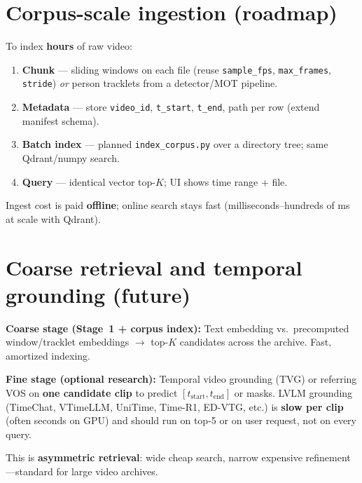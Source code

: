 \documentclass[11pt,a4paper]{article}
\begin{document}
\section{Corpus-scale ingestion (roadmap)}

\label{sec:corpus}

To index \textbf{hours} of raw video:
\begin{enumerate}
  \item \textbf{Chunk} --- sliding windows on each file (reuse \texttt{sample\_fps}, \texttt{max\_frames}, \texttt{stride}) \emph{or} person tracklets from a detector/MOT pipeline.
  \item \textbf{Metadata} --- store \texttt{video\_id}, \texttt{t\_start}, \texttt{t\_end}, path per row (extend manifest schema).
  \item \textbf{Batch index} --- planned \texttt{index\_corpus.py} over a directory tree; same Qdrant/numpy search.
  \item \textbf{Query} --- identical vector top-$K$; UI shows time range + file.
\end{enumerate}

Ingest cost is paid \textbf{offline}; online search stays fast (milliseconds--hundreds of ms at scale with Qdrant).

\section{Coarse retrieval and temporal grounding (future)}

\label{sec:grounding}

\textbf{Coarse stage (Stage~1 + corpus index):} Text embedding vs.\ precomputed window/tracklet embeddings $\rightarrow$ top-$K$ candidates across the archive.
Fast, amortized indexing.

\textbf{Fine stage (optional research):} Temporal video grounding (TVG) or referring VOS on \textbf{one candidate clip} to predict $[t_{\mathrm{start}}, t_{\mathrm{end}}]$ or masks.
LVLM grounding (TimeChat, VTimeLLM, UniTime, Time-R1, ED-VTG, etc.) is \textbf{slow per clip} (often seconds on GPU) and should run on top-5 or on user request, not on every query.

This is \textbf{asymmetric retrieval}: wide cheap search, narrow expensive refinement---standard for large video archives.
\end{document}
